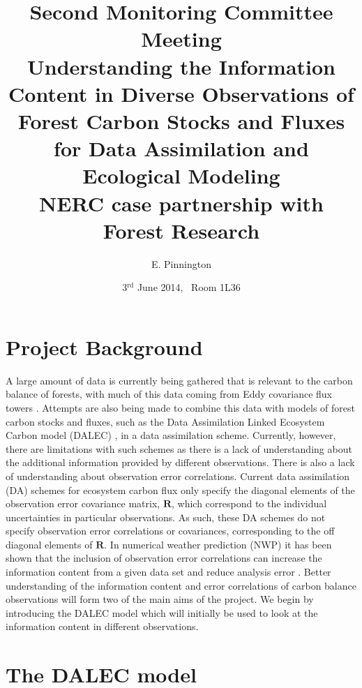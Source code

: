 \documentclass[11pt]{article}
\title{Second Monitoring Committee Meeting\\\vspace{4mm} \normalsize{Understanding the Information Content in Diverse Observations of Forest Carbon Stocks and Fluxes for Data Assimilation and Ecological Modeling\\ NERC case partnership with Forest Research}}
\date{\normalsize{3$^{\text{rd}}$ June 2014, \ Room 1L36}}
\author{\normalsize{E. Pinnington}}
\begin{document}
\maketitle

\section*{Project Background}

A large amount of data is currently being gathered that is relevant to the carbon balance of forests, with much of this data coming from Eddy covariance flux towers \cite{baldocchi2008turner}. Attempts are also being made to combine this data with models of forest carbon stocks and fluxes, such as the Data Assimilation Linked Ecosystem Carbon model (DALEC) \cite{williams2005improved}, in a data assimilation scheme. Currently, however, there are limitations with such schemes as there is a lack of understanding about the additional information provided by different observations. There is also a lack of understanding about observation error correlations. Current data assimilation (DA) schemes for ecosystem carbon flux only specify the diagonal elements of the observation error covariance matrix, $\textbf{R}$, which correspond to the individual uncertainties in particular observations. As such, these DA schemes do not specify observation error correlations or covariances, corresponding to the off diagonal elements of $\textbf{R}$. In numerical weather prediction (NWP) it has been shown that the inclusion of observation error correlations can increase the information content from a given data set and reduce analysis error \cite{stewart2008correlated, stewart2009observation, stewart2013data}. Better understanding of the information content and error correlations of carbon balance observations will form two of the main aims of the project. We begin by introducing the DALEC model which will initially be used to look at the information content in different observations.

\section*{The DALEC model}
\end{document}
